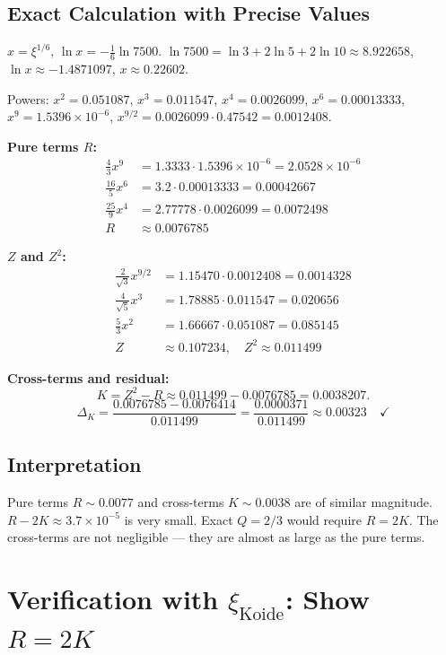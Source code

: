 \subsection{Exact Calculation with Precise Values}
\label{sec:259-exact}

$x=\xi^{1/6}$, $\ln x=-\tfrac{1}{6}\ln7500$.
$\ln7500=\ln3+2\ln5+2\ln10\approx8.922658$,
$\ln x\approx-1.4871097$, $x\approx0.22602$.

Powers:
$x^2=0.051087$, $x^3=0.011547$, $x^4=0.0026099$,
$x^6=0.00013333$, $x^9=1.5396\times10^{-6}$,
$x^{9/2}=0.0026099\cdot0.47542=0.0012408$.

\textbf{Pure terms $R$:}
\begin{align*}
  \tfrac{4}{3}x^9 &= 1.3333\cdot1.5396\times10^{-6}=2.0528\times10^{-6} \\
  \tfrac{16}{5}x^6 &= 3.2\cdot0.00013333=0.00042667 \\
  \tfrac{25}{9}x^4 &= 2.77778\cdot0.0026099=0.0072498 \\
  R &\approx 0.0076785
\end{align*}

\textbf{$Z$ and $Z^2$:}
\begin{align*}
  \tfrac{2}{\sqrt{3}}x^{9/2} &= 1.15470\cdot0.0012408=0.0014328 \\
  \tfrac{4}{\sqrt{5}}x^3 &= 1.78885\cdot0.011547=0.020656 \\
  \tfrac{5}{3}x^2 &= 1.66667\cdot0.051087=0.085145 \\
  Z &\approx 0.107234, \quad Z^2\approx0.011499
\end{align*}

\textbf{Cross-terms and residual:}
\[
  K=Z^2-R\approx0.011499-0.0076785=0.0038207.
\]
\[
  \Delta_K=\frac{0.0076785-0.0076414}{0.011499}
  =\frac{0.0000371}{0.011499}\approx\mathbf{0.00323}\quad\checkmark
\]

\subsection{Interpretation}

Pure terms $R\sim0.0077$ and cross-terms $K\sim0.0038$ are of similar magnitude.
$R-2K\approx3.7\times10^{-5}$ is very small.
Exact $Q=2/3$ would require $R=2K$.
The cross-terms are not negligible --- they are almost as large as the pure terms.

\section{Verification with $\xi_{\text{Koide}}$: Show $R=2K$}


